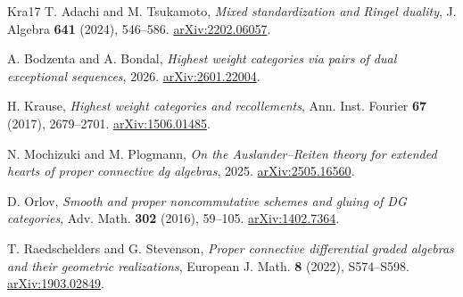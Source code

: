 \documentclass[11pt,a4paper]{article}
\theoremstyle{plain}
\theoremstyle{definition}
\numberwithin{equation}{section}
\begin{document}
\begin{thebibliography}{Kra17}
 T. Adachi and M. Tsukamoto,
\emph{Mixed standardization and Ringel duality},
J. Algebra \textbf{641} (2024), 546--586.
\href{https://arxiv.org/abs/2202.06057}{arXiv:2202.06057}.

 A. Bodzenta and A. Bondal,
\emph{Highest weight categories via pairs of dual exceptional sequences},
2026. \href{https://arxiv.org/abs/2601.22004}{arXiv:2601.22004}.

 H. Krause,
\emph{Highest weight categories and recollements},
Ann. Inst. Fourier \textbf{67} (2017), 2679--2701.
\href{https://arxiv.org/abs/1506.01485}{arXiv:1506.01485}.

 N. Mochizuki and M. Plogmann,
\emph{On the Auslander--Reiten theory for extended hearts of proper
connective dg algebras}, 2025.
\href{https://arxiv.org/abs/2505.16560}{arXiv:2505.16560}.

 D. Orlov,
\emph{Smooth and proper noncommutative schemes and gluing of DG categories},
Adv. Math. \textbf{302} (2016), 59--105.
\href{https://arxiv.org/abs/1402.7364}{arXiv:1402.7364}.

 T. Raedschelders and G. Stevenson,
\emph{Proper connective differential graded algebras and their geometric
realizations}, European J. Math. \textbf{8} (2022), S574--S598.
\href{https://arxiv.org/abs/1903.02849}{arXiv:1903.02849}.

\end{thebibliography}
\end{document}
